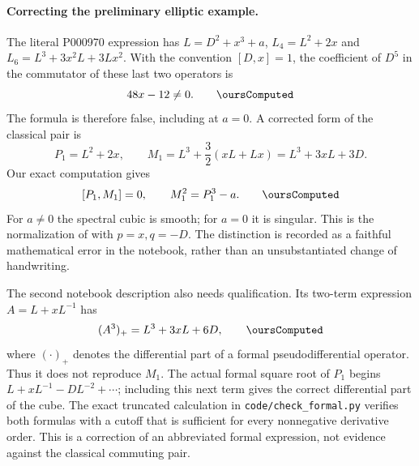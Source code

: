 \paragraph{Correcting the preliminary elliptic example.}
The literal P000970 expression has \(L=D^2+x^3+a\), \(L_4=L^2+2x\) and \(L_6=L^3+3x^2L+3Lx^2\). With the convention \([D,x]=1\), the coefficient of \(D^5\) in the commutator of these last two operators is
\[
 48x-12\ne0.\qquad\oursComputed
\]
The formula is therefore false, including at \(a=0\). A corrected form of the classical pair is
\[
 P_1=L^2+2x,\qquad
 M_1=L^3+\frac32(xL+Lx)=L^3+3xL+3D.
\]
Our exact computation gives
\[
 [P_1,M_1]=0,\qquad M_1^2=P_1^3-a.\qquad\oursComputed
\]
For \(a\ne0\) the spectral cubic is smooth; for \(a=0\) it is singular. This is the normalization of \citet[Proposition~5.5]{dixmier1968weyl} with \(p=x,q=-D\). The distinction is recorded as a faithful mathematical error in the notebook, rather than an unsubstantiated change of handwriting.

The second notebook description also needs qualification. Its two-term expression \(A=L+xL^{-1}\) has
\[
 (A^3)_+=L^3+3xL+6D,\qquad\oursComputed
\]
where \((\cdot)_+\) denotes the differential part of a formal pseudodifferential operator. Thus it does not reproduce \(M_1\). The actual formal square root of \(P_1\) begins \(L+xL^{-1}-DL^{-2}+\cdots\); including this next term gives the correct differential part of the cube. The exact truncated calculation in \texttt{code/check\_formal.py} verifies both formulas with a cutoff that is sufficient for every nonnegative derivative order. This is a correction of an abbreviated formal expression, not evidence against the classical commuting pair.


